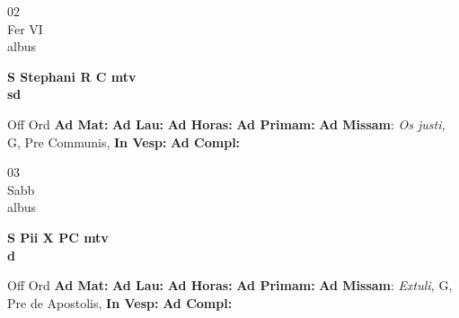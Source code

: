 \documentclass[10pt, openany]{book}
\begin{document}
    \begin{center}
        \begin{minipage}{3.5in}
            \vspace{2em}
            \begin{minipage}{0.5in}
                {\Huge 02} \\
                {\normalsize Fer VI} \\
                {\normalsize albus}
            \end{minipage}
            \begin{minipage}{3.0in}
                \textbf{ \large S Stephani R C mtv \\
                \textnormal{\normalsize sd}} \\ 
            \end{minipage}
            \begin{justify}Off Ord
                \textbf{Ad Mat: }
                \textbf{Ad Lau: }
                \textbf{Ad Horas: }
                \textbf{Ad Primam: }\textbf{Ad Missam}: \textit{Os justi,} G, Pre Communis,  
                \textbf{In Vesp: }
                \textbf{Ad Compl: }
            \end{justify}
        \end{minipage}
    \end{center}

    \begin{center}
        \begin{minipage}{3.5in}
            \vspace{2em}
            \begin{minipage}{0.5in}
                {\Huge 03} \\
                {\normalsize Sabb} \\
                {\normalsize albus}
            \end{minipage}
            \begin{minipage}{3.0in}
                \textbf{ \large S Pii X PC mtv \\
                \textnormal{\normalsize d}} \\ 
            \end{minipage}
            \begin{justify}Off Ord
                \textbf{Ad Mat: }
                \textbf{Ad Lau: }
                \textbf{Ad Horas: }
                \textbf{Ad Primam: }\textbf{Ad Missam}: \textit{Extuli,} G, Pre de Apostolis,  
                \textbf{In Vesp: }
                \textbf{Ad Compl: }
            \end{justify}
        \end{minipage}
    \end{center}
\end{document}
